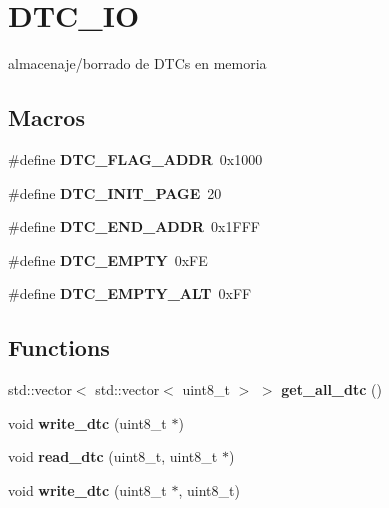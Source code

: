 \hypertarget{group__DTC__IO}{}\section{D\+T\+C\+\_\+\+IO}
\label{group__DTC__IO}


almacenaje/borrado de D\+TC\textquotesingle{}s en memoria  


\subsection*{Macros}
\begin{DoxyCompactItemize}
\item 
\mbox{\label{group__DTC__IO_gaf895544cfc22a7bab94504ea1d6e354c}} 
\#define {\bfseries D\+T\+C\+\_\+\+F\+L\+A\+G\+\_\+\+A\+D\+DR}~0x1000
\item 
\mbox{\label{group__DTC__IO_ga0d654918ede023d8b7a8b45bff063dff}} 
\#define {\bfseries D\+T\+C\+\_\+\+I\+N\+I\+T\+\_\+\+P\+A\+GE}~20
\item 
\mbox{\label{group__DTC__IO_ga239b4015a777f1ed98ec501f0362cbfc}} 
\#define {\bfseries D\+T\+C\+\_\+\+E\+N\+D\+\_\+\+A\+D\+DR}~0x1\+F\+FF
\item 
\mbox{\label{group__DTC__IO_gaa87f2fa3a82da552afa4de5630f5cb57}} 
\#define {\bfseries D\+T\+C\+\_\+\+E\+M\+P\+TY}~0x\+FE
\item 
\mbox{\label{group__DTC__IO_gaf377a303e8d85e07f9be5dfc016c4643}} 
\#define {\bfseries D\+T\+C\+\_\+\+E\+M\+P\+T\+Y\+\_\+\+A\+LT}~0x\+FF
\end{DoxyCompactItemize}
\subsection*{Functions}
\begin{DoxyCompactItemize}
\item 
\mbox{\label{group__DTC__IO_gac9b1c1ae7ede810de0c3e6f66ab4c438}} 
std\+::vector$<$ std\+::vector$<$ uint8\+\_\+t $>$ $>$ {\bfseries get\+\_\+all\+\_\+dtc} ()
\item 
\mbox{\label{group__DTC__IO_ga704a3c4e7739c7aac25a80794996e312}} 
void {\bfseries write\+\_\+dtc} (uint8\+\_\+t $\ast$)
\item 
\mbox{\label{group__DTC__IO_gac91421ad57034471637dc291ba1e559a}} 
void {\bfseries read\+\_\+dtc} (uint8\+\_\+t, uint8\+\_\+t $\ast$)
\item 
\mbox{\label{group__DTC__IO_gad2cadce35748d695d07e80b4efbf1831}} 
void {\bfseries write\+\_\+dtc} (uint8\+\_\+t $\ast$, uint8\+\_\+t)
\end{DoxyCompactItemize}


